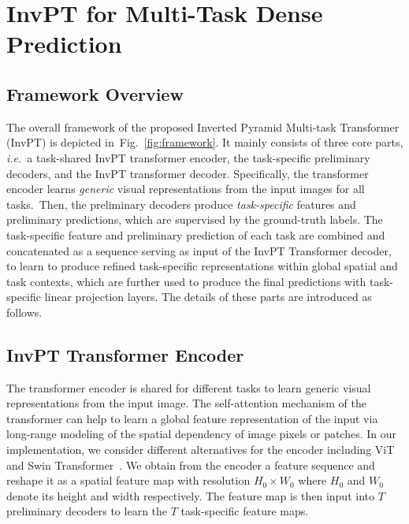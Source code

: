 \documentclass[runningheads]{llncs}
\newcommand*{\ie}{\emph{i.e.}}
\begin{document}
\section{InvPT for Multi-Task Dense Prediction}
\subsection{Framework Overview}
The overall framework of the proposed Inverted Pyramid Multi-task Transformer (InvPT) is depicted in~Fig.~\ref{fig:framework}.
It mainly consists of three core parts, \ie~a task-shared InvPT transformer encoder, the task-specific preliminary decoders, and the InvPT transformer decoder. Specifically, the transformer encoder learns \emph{generic} visual representations from the input images for all tasks.~Then, the preliminary decoders produce \emph{task-specific} features and preliminary predictions, which are supervised by the ground-truth labels.
The task-specific feature and preliminary prediction of each task are combined and concatenated as a sequence serving as input of the InvPT Transformer decoder, to learn to produce refined task-specific representations within global spatial and task contexts, which are further used to produce the final predictions with task-specific linear projection layers. The details of these parts are introduced as follows.

\subsection{InvPT Transformer Encoder}
The transformer encoder is shared for different tasks to learn generic visual representations from the input image. The self-attention mechanism of the transformer can help to learn a global feature representation of the input via long-range modeling of the spatial dependency of image pixels or patches.
In our implementation, we consider different alternatives for the encoder including ViT~\cite{vit} and Swin Transformer~\cite{swin}. We obtain from the encoder a feature sequence and reshape it as a spatial feature map with resolution $H_0\times W_0$ where $H_0$ and $W_0$ denote its height and width respectively. The feature map is then input into $T$ preliminary decoders to learn the $T$ task-specific feature maps.
\end{document}
